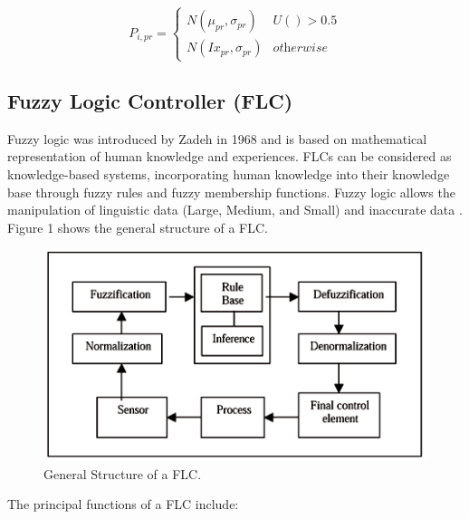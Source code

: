 \documentclass{sig-alternate-05-2015}
\begin{document}
\begin{equation}
     \label{eq1}
     P_{i,pr} = \left\{
	       \begin{array}{ll}
	       N(\mu_{pr},\sigma_{pr}) & U() > 0.5 \\
	       N(Ix_{pr},\sigma_{pr}) & \mathrm{\textit{otherwise}}
	       \end{array}
	     \right.
\end{equation}


\subsection{Fuzzy Logic Controller (FLC)}
Fuzzy logic was introduced by Zadeh in 1968 and is based on mathematical representation of human knowledge and experiences. FLCs can be considered as knowledge-based systems, incorporating human knowledge into their knowledge base through fuzzy rules and fuzzy membership functions. Fuzzy logic allows the manipulation of linguistic data (Large, Medium, and Small) and inaccurate data \cite{odeh:flc}. Figure 1 shows the general structure of a FLC.


\begin{figure}[h]
\centering
\includegraphics [scale=0.4]{fuzzysystem}
\caption{General Structure of a FLC.}
\end{figure}

The principal functions of a FLC include: \\
\end{document}
